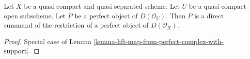 \begin{lemma}
\label{lemma-direct-summand-of-a-restriction}
Let $X$ be a quasi-compact and quasi-separated scheme.
Let $U$ be a quasi-compact open subscheme.
Let $P$ be a perfect object of $D(\mathcal{O}_U)$.
Then $P$ is a direct summand of the restriction of a perfect
object of $D(\mathcal{O}_X)$.
\end{lemma}

\begin{proof}
Special case of Lemma \ref{lemma-lift-map-from-perfect-complex-with-support}.
\end{proof}
